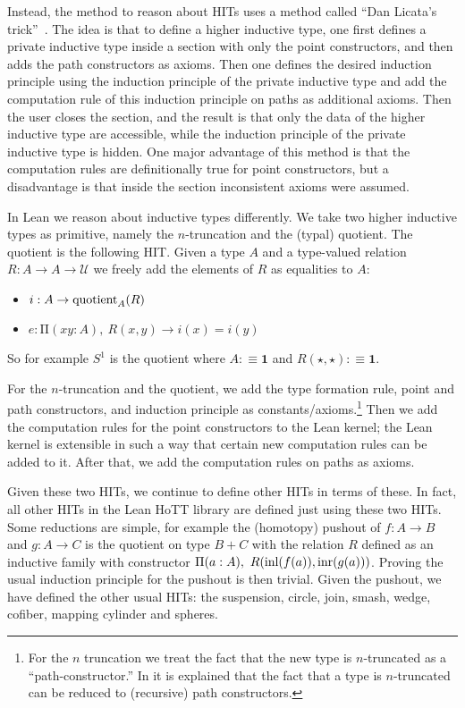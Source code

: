 \documentclass{llncs}
\newcommand{\fa}[2]{\ensuremath{\mathrm{\Pi}(#1),\ #2}}
\newcommand{\unit}{\ensuremath{\mathbf{1}}}
\newcommand{\quotient}{\textnormal{quotient}}
\newcommand{\inl}{\textnormal{inl}}
\newcommand{\inr}{\textnormal{inr}}
\newcommand{\UU}{\mathcal{U}}
\begin{document}
Instead, the method to reason about HITs uses a method called ``Dan Licata's
trick''~\cite{Licata2011trick}. The idea is that to define a higher inductive type, one first
defines a private inductive type inside a section with only the point constructors, and then adds
the path constructors as axioms. Then one defines the desired induction principle using the
induction principle of the private inductive type and add the computation rule of this induction
principle on paths as additional axioms. Then the user closes the section, and the result is that
only the data of the higher inductive type are accessible, while the induction principle of the
private inductive type is hidden. One major advantage of this method is that the computation rules
are definitionally true for point constructors, but a disadvantage is that inside the section
inconsistent axioms were assumed.

In Lean we reason about inductive types differently.  We take two higher inductive types as
primitive, namely the $n$-truncation and the (typal) quotient. The quotient is the following
HIT. Given a type $A$ and a type-valued relation $R : A \to A \to \UU$ we freely add the elements of
$R$ as equalities to $A$:
\begin{itemize}
  \item $i : A \to \quotient_A(R)$
  \item $e : \fa{x y : A}{R(x,y) \to i(x)=i(y)}$
\end{itemize}
So for example $S^1$ is the quotient where $A:\equiv\unit$ and $R(\star,\star):\equiv\unit$.

For the $n$-truncation and the quotient, we add the type formation rule, point and path
constructors, and induction principle as constants/axioms.\footnote{For the $n$ truncation we treat
  the fact that the new type is $n$-truncated as a ``path-constructor.'' In
  \cite[Section~7.3]{hottbook} it is explained that the fact that a type is $n$-truncated can be
  reduced to (recursive) path constructors.} Then we add the computation rules for the point
constructors to the Lean kernel; the Lean kernel is extensible in such a way that certain new
computation rules can be added to it. After that, we add the computation rules on paths as axioms.

Given these two HITs, we continue to define other HITs in terms of these. In fact, all other HITs in
the Lean HoTT library are defined just using these two HITs. Some reductions are simple, for example
the (homotopy) pushout of $f : A \to B$ and $g : A \to C$ is the quotient on type $B+C$ with the
relation $R$ defined as an inductive family with constructor $\fa{a : A}
{R(\inl(f(a)),\inr(g(a)))}$. Proving the usual induction principle for the pushout is then
trivial. Given the pushout, we have defined the other usual HITs: the suspension, circle, join,
smash, wedge, cofiber, mapping cylinder and spheres.
\end{document}
